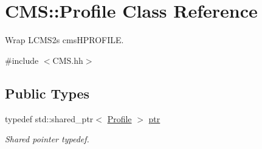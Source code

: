 \hypertarget{class_c_m_s_1_1_profile}{}\section{C\+MS\+:\+:Profile Class Reference}
\label{class_c_m_s_1_1_profile}


Wrap L\+C\+M\+S2\textquotesingle{}s cms\+H\+P\+R\+O\+F\+I\+LE.  




{\ttfamily \#include $<$C\+M\+S.\+hh$>$}

\subsection*{Public Types}
\begin{DoxyCompactItemize}
\item 
typedef std\+::shared\+\_\+ptr$<$ \hyperlink{class_c_m_s_1_1_profile}{Profile} $>$ \hyperlink{class_c_m_s_1_1_profile_a7d5a80e1317d17dbfdf5ae69820ab08b}{ptr}
\begin{DoxyCompactList}\small\item\em Shared pointer typedef. \end{DoxyCompactList}\end{DoxyCompactItemize}
